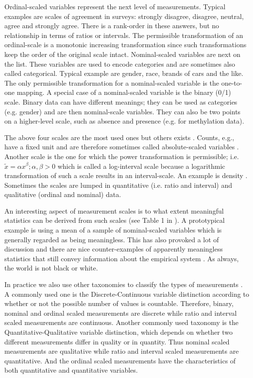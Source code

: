 Ordinal-scaled variables represent the next level of measurements. Typical examples are scales of agreement in surveys: strongly disagree, disagree, neutral, agree and strongly agree. There is a rank-order in these answers, but no relationship in terms of ratios or intervals. The permissible transformation of an ordinal-scale is a monotonic increasing transformation since such transformations keep the order of the original scale intact. Nominal-scaled variables are next on the list. These variables are used to encode categories and are sometimes also called categorical. Typical example are gender, race, brands of cars and the like. The only permissible transformation for a nominal-scaled variable is the one-to-one mapping. A special case of a nominal-scaled variable is the binary (0/1) scale. Binary data can have different meanings; they can be used as categories (e.g. gender) and are then nominal-scale variables. They can also be two points on a higher-level scale, such as absence and presence (e.g. for methylation data).

The above four scales are the most used ones but others exists \cite{Suppes1962,Krantz1971}. Counts, e.g., have a fixed unit and are therefore sometimes called absolute-scaled variables \cite{Narens1986}. Another scale is the one for which the power transformation is permissible; i.e. $\widetilde{x}=\alpha x^\beta; \alpha, \beta>0$ which is called a log-interval scale because a logarithmic transformation of such a scale results in an interval-scale. An example is density \cite{Krantz1971}. Sometimes the scales are lumped in quantitative (i.e. ratio and interval) and qualitative (ordinal and nominal) data.

An interesting aspect of measurement scales is to what extent meaningful statistics can be derived from such scales (see Table 1 in \cite{Stevens1946}). A prototypical example is using a mean of a sample of nominal-scaled variables which is generally regarded as being meaningless. This has also provoked a lot of discussion \cite{Adams1965,Hand1996} and there are nice counter-examples of apparently meaningless statistics that still convey information about the empirical system \cite{Michell1986}. As always, the world is not black or white.

In practice we also use other taxonomies to classify the types of measurements \cite{agresti2013categorical}. A commonly used one is the Discrete-Continuous variable distinction according to whether or not the possible number of values is countable. Therefore, binary, nominal and ordinal scaled measurements are discrete while ratio and interval scaled measurements are continuous. Another commonly used taxonomy is the Quantitative-Qualitative variable distinction, which depends on whether two different measurements differ in quality or in quantity. Thus nominal scaled measurements are qualitative while ratio and interval scaled measurements are quantitative. And the ordinal scaled measurements have the characteristics of both quantitative and quantitative variables.

